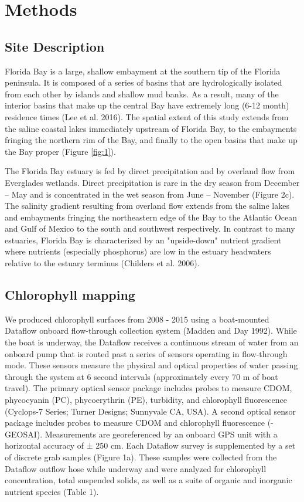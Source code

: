 \section{Methods}
\label{methods}
\subsection{Site Description}
\label{sitedescription}
Florida Bay is a large, shallow embayment at the southern tip of the Florida peninsula. It is composed of a series of basins that are hydrologically isolated from each other by islands and shallow mud banks. As a result, many of the interior basins that make up the central Bay have extremely long (6-12 month) residence times (Lee et al. 2016). The spatial extent of this study extends from the saline coastal lakes immediately upstream of Florida Bay, to the embayments fringing the northern rim of the Bay, and finally to the open basins that make up the Bay proper (Figure \ref{fig:1}). 

The Florida Bay estuary is fed by direct precipitation and by overland flow from Everglades wetlands. Direct precipitation is rare in the dry season from December – May and is concentrated in the wet season from June – November (Figure 2c). The salinity gradient resulting from overland flow extends from the saline lakes and embayments fringing the northeastern edge of the Bay to the Atlantic Ocean and Gulf of Mexico to the south and southwest respectively. In contrast to many estuaries, Florida Bay is characterized by an "upside-down" nutrient gradient where nutrients (especially phosphorus) are low in the estuary headwaters relative to the estuary terminus (Childers et al. 2006).

\subsection{Chlorophyll mapping}
\label{chlmapping}

We produced chlorophyll surfaces from 2008 - 2015 using a boat-mounted Dataflow onboard flow-through collection system (Madden and Day 1992). While the boat is underway, the Dataflow receives a continuous stream of water from an onboard pump that is routed past a series of sensors operating in flow-through mode. These sensors measure the physical and optical properties of water passing through the system at 6 second intervals (approximately every 70 m of boat travel). The primary optical sensor package includes probes to measure CDOM, phycocyanin (PC), phycoerythrin (PE), turbidity, and chlorophyll fluorescence (Cyclops-7 Series; Turner Designs; Sunnyvale CA, USA). A second optical sensor package includes probes to measure CDOM and chlorophyll fluorescence (-GEOSAI). Measurements are georeferenced by an onboard GPS unit with a horizontal accuracy of ± 250 cm. Each Dataflow survey is supplemented by a set of discrete grab samples (Figure 1a). These samples were collected from the Dataflow outflow hose while underway and were analyzed for chlorophyll concentration, total suspended solids, as well as a suite of organic and inorganic nutrient species (Table 1).

